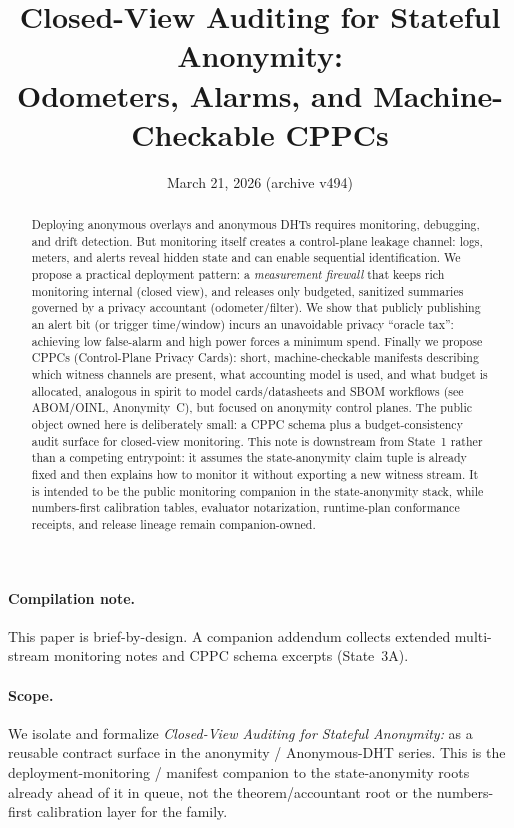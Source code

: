 \documentclass[11pt]{article}
\title{Closed-View Auditing for Stateful Anonymity:\\Odometers, Alarms, and Machine-Checkable CPPCs}
\author{}
\date{March 21, 2026 (archive v494)}
\begin{document}
\maketitle

\begin{abstract}
Deploying anonymous overlays and anonymous DHTs requires monitoring, debugging, and drift detection.
But monitoring itself creates a control-plane leakage channel: logs, meters, and alerts reveal hidden state
and can enable sequential identification.
We propose a practical deployment pattern: a \emph{measurement firewall} that keeps rich monitoring internal (closed view),
and releases only budgeted, sanitized summaries governed by a privacy accountant (odometer/filter).
We show that publicly publishing an alert bit (or trigger time/window) incurs an unavoidable privacy ``oracle tax'':
achieving low false-alarm and high power forces a minimum spend.
Finally we propose CPPCs (Control-Plane Privacy Cards): short, machine-checkable manifests describing
which witness channels are present, what accounting model is used, and what budget is allocated,
analogous in spirit to model cards/datasheets and SBOM workflows (see ABOM/OINL, Anonymity~C), but focused on anonymity control planes.\cite{series:abomoinl}
The public object owned here is deliberately small: a CPPC schema plus a budget-consistency audit surface for closed-view monitoring.
This note is downstream from State~1 rather than a competing entrypoint: it assumes the state-anonymity claim tuple is already fixed and then explains how to monitor it without exporting a new witness stream.
It is intended to be the public monitoring companion in the state-anonymity stack, while numbers-first calibration tables, evaluator notarization, runtime-plan conformance receipts, and release lineage remain companion-owned.\cite{series:eval3,series:evalnotary,series:opB,series:release}
\end{abstract}

\paragraph{Compilation note.}
This paper is brief-by-design. A companion addendum collects extended multi-stream monitoring notes and CPPC schema excerpts (State~3A).\cite{series:state3addendum}

\paragraph{Scope.}
We isolate and formalize \emph{Closed-View Auditing for Stateful Anonymity:} as a reusable contract surface in the anonymity / Anonymous-DHT series.
This is the deployment-monitoring / manifest companion to the state-anonymity roots already ahead of it in queue, not the theorem/accountant root or the numbers-first calibration layer for the family.
\end{document}
